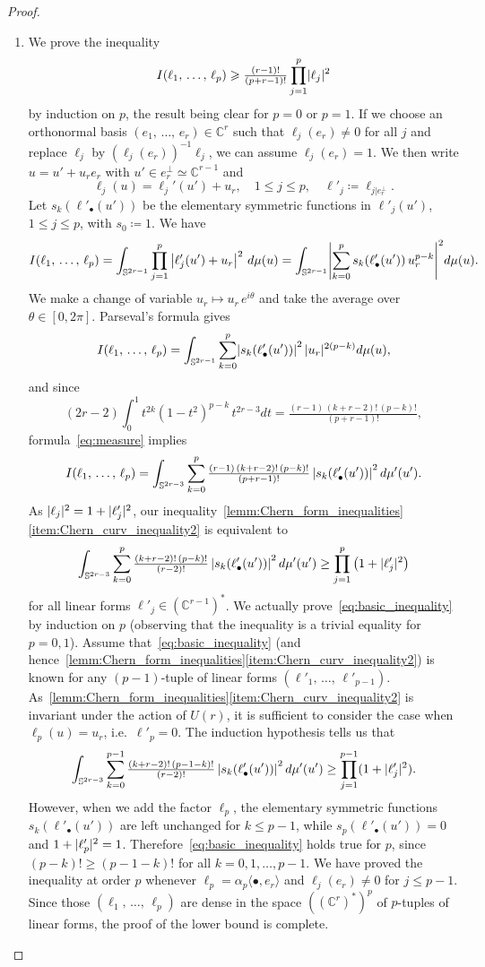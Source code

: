 \documentclass[AHL,Unicode,longabstracts,published]{cedram}
\DeclarePairedDelimiter{\abs}{\lvert}{\rvert}
\newcommand*\bC{\mathbb{C}}
\newcommand*\bS{\mathbb{S}}
\let\leq\leqslant
\let\geq\geqslant
\newcommand*\bydef{\coloneqq}
\begin{document}
\begin{proof}
\begin{enumerate}
\item We prove the inequality
\[
I(\ell_1,\,\dotsc,\,\ell_p)\geq \tfrac{(r-1)!}{(p+r-1)!}\prod_{j=1}^p\abs{\ell_j}^2
\]
by induction on $p$, the result being clear for $p=0$ or $p=1$. If we choose an orthonormal basis $(e_1,\,\dotsc,\,e_r)\in\bC^r$ such that
$\ell_j(e_r)\ne 0$ for all $j$ and replace $\ell_j$ by
$(\ell_j(e_r))^{-1}\ell_j$, we can assume $\ell_j(e_r)=1$. We then write $u=u'+u_re_r$ with $u'\in e_r^\perp\simeq\bC^{r-1}$ and
\[
\ell_j(u)=\ell_j'(u')+u_r,\quad 1\leq j\leq p,\quad\ell'_j
\bydef
\ell_{j|e_r^\perp}.
\]
Let $s_k(\ell'_\bullet(u'))$ be the elementary symmetric functions in $\ell'_j(u')$, $1\leq j\leq p$, with $s_0\bydef1$. We have
\[
I(\ell_1,\,\dotsc,\,\ell_p) =\int_{\bS^{2r-1}}\prod_{j=1}^p\left|\ell'_j(u')+u_r\right|^2\,d\mu(u) =\int_{\bS^{2r-1}}
\abs*{\sum_{k=0}^ps_k(\ell'_\bullet(u'))\,u_r^{p-k}}^2 d\mu(u).
\]
We make a change of variable $u_r\mapsto u_r\,e^{i\theta}$ and take the average over $\theta\in[0,2\pi]$. Parseval's formula gives
\[
I(\ell_1,\,\dotsc,\,\ell_p) =\int_{\bS^{2r-1}}\sum_{k=0}^p\abs*{s_k(\ell'_\bullet(u'))}^2\,\abs{u_r}^{2(p-k)} d\mu(u),
\]
and since
\[
(2r-2)\int_0^1t^{2k}(1-t^2)^{p-k}\,t^{2r-3}dt=
\tfrac{(r-1)\,(k+r-2)!\,(p-k)!}{(p+r-1)!},
\]
formula~\eqref{eq:measure} implies
\[
I(\ell_1,\,\dotsc,\,\ell_p) =\int_{\bS^{2r-3}}\sum_{k=0}^p\tfrac{(r-1)\,(k+r-2)!\,(p-k)!}{(p+r-1)!}\,
\abs*{s_k(\ell'_\bullet(u'))}^2\,d\mu'(u').
\]
As $\abs{\ell_j}^2=1+\abs{\ell'_j}^2$, our inequality~\ref{lemm:Chern_form_inequalities}\eqref{item:Chern_curv_inequality2} is equivalent to
\begin{equation}\label{eq:basic_inequality}
\int_{\bS^{2r-3}}\sum_{k=0}^p\tfrac{(k+r-2)!\,(p-k)!}{(r-2)!}\,
\abs*{s_k(\ell'_\bullet(u'))}^2\,d\mu'(u')\ge
\prod_{j=1}^p\left(1+\abs{\ell'_j}^2\right)
\end{equation}
for all linear forms $\ell'_j\in(\bC^{r-1})^*$. We actually prove~\eqref{eq:basic_inequality} by induction on $p$ (observing that the inequality is a trivial equality for $p=0,1$). Assume that~\eqref{eq:basic_inequality} (and hence~\ref{lemm:Chern_form_inequalities}\eqref{item:Chern_curv_inequality2}) is known for any $(p-1)$-tuple of linear forms $(\ell'_1,\,\dotsc,\,\ell'_{p-1})$. As~\ref{lemm:Chern_form_inequalities}\eqref{item:Chern_curv_inequality2} is invariant under the action of $U(r)$, it is sufficient to consider the case when $\ell_p(u)=u_r$, i.e.\ $\ell'_p=0$. The induction hypothesis tells us that
\[
\int_{\bS^{2r-3}}\sum_{k=0}^{p-1}\tfrac{(k+r-2)!\,(p-1-k)!}{(r-2)!}\,
\abs*{s_k(\ell'_\bullet(u'))}^2\,d\mu'(u')\ge
\prod_{j=1}^{p-1}(1+\abs{\ell'_j}^2).
\]
However, when we add the factor $\ell_p$, the elementary symmetric functions $s_k(\ell'_\bullet(u'))$ are left unchanged for $k\leq p-1$, while
$s_p(\ell'_\bullet(u'))=0$ and $1+\abs{\ell'_p}^2=1$. Therefore~\eqref{eq:basic_inequality} holds true for $p$, since $(p-k)!\geq (p-1-k)!$ for all $k=0,1,\dotsc,p-1$. We have proved the inequality at order $p$ whenever
$\ell_p=\alpha_p\langle\bullet,e_r\rangle$ and $\ell_j(e_r)\ne 0$ for $j\leq p-1$. Since those $(\ell_1,\,\dotsc,\,\ell_p)$ are dense in the space $((\bC^r)^*)^p$ of $p$-tuples of linear forms, the proof of the lower bound is complete.


\end{enumerate}
\end{proof}
\end{document}
